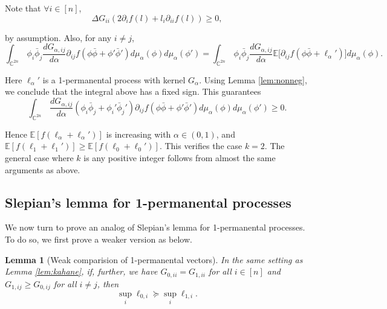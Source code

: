 \documentclass[a4paper, 11pt]{article}
\newcommand{\E}{\mathbb{E}}
\newtheorem{lem}[thm]{Lemma}
\begin{document}
Note that $\forall i\in [n]$,
\[\Delta G_{ii}(2\partial_i f(l)+l_i\partial_{ii} f(l))\geq 0,\]

by assumption. Also, for any $i\neq j$,
\[
\int_{\mathbb{C}^{2n}}\, \phi_i\bar{\phi}_j \frac{d G_{\alpha,ij}}{d\alpha} \partial_{ij}f(\phi\bar{\phi}  +\phi'\bar{\phi}')
d\mu_\alpha(\phi)d\mu_\alpha(\phi') =\int_{\mathbb{C}^{2n}}\, \phi_i\bar{\phi}_j\frac{d G_{\alpha,ij}}{d\alpha} \E\big[ \partial_{ij}f(\phi\bar{\phi}+\ell_\alpha')\big]d\mu_\alpha(\phi).
\]

Here $\ell_\alpha'$ is a 1-permanental process with kernel $G_\alpha$. Using Lemma \ref{lem:nonneg}, we conclude that the integral above has a fixed sign. This guarantees
\[\int_{\mathbb{C}^{2n}}\, \frac{d G_{\alpha,ij}}{d\alpha}(\phi_i\bar{\phi}_j+\phi_i'\bar{\phi}_j')\partial_{ij} f(\phi\bar{\phi}+\phi'\bar{\phi}')
d\mu_\alpha(\phi)d\mu_\alpha(\phi')\geq 0.\]

Hence $\E[f(\ell_\alpha+\ell_\alpha')]$ is increasing with $\alpha\in(0,1)$, and $\E[f(\ell_1+\ell_1')]\geq \E[f(\ell_0+\ell_0')]$. This verifies the case $k=2$. The general case where $k$ is any positive integer follows from almost the same arguments as above.

\subsection{Slepian's lemma for 1-permanental processes}

We now turn to prove an analog of Slepian's lemma for 1-permanental processes. To do so, we first prove a weaker version as below.

\vspace{.3em} \begin{lem}[Weak comparision of 1-permanental vectors]
\label{lem:weak_comp}
In the same setting as Lemma \ref{lem:kahane}, if, further, we have $G_{0,ii}=G_{1,ii}$ for all $i\in[n]$ and $G_{1,ij}\geq G_{0,ij}$ for all $i\neq j$, then
\[\sup_i \ell_{0,i}\succeq \sup_i\ell_{1,i}.\]
\end{lem}
\end{document}
